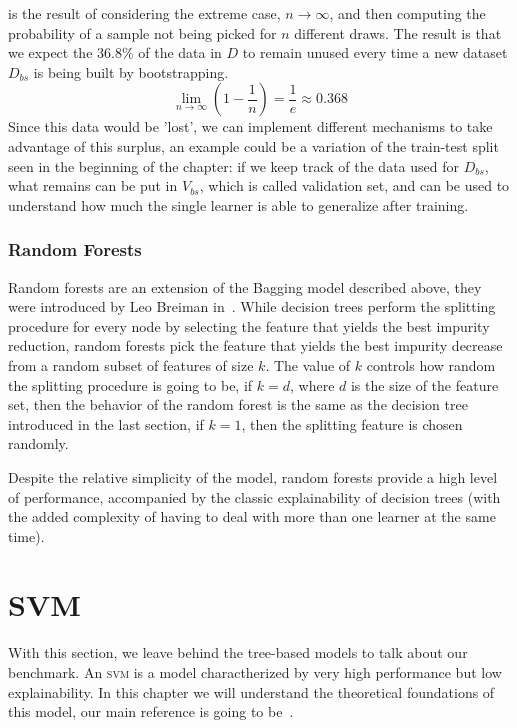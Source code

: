  is the result of considering the extreme case, $n \rightarrow \infty$, and
then computing the probability of a sample not being picked for $n$ different draws. The result is
that we expect the $36.8\%$ of the data in $D$ to remain unused every time a new dataset $D_{bs}$ is
being built by bootstrapping.
\begin{equation}
	\label{eq:bagging-limit}
	\lim_{n \rightarrow \infty} \left(1 - \frac{1}{n}\right) = \frac{1}{e} \approx 0.368
\end{equation}
Since this data would be 'lost', we can implement different mechanisms to take advantage of this
surplus, an example could be a variation of the train-test split seen in the beginning of the
chapter: if we keep track of the data used for $D_{bs}$, what remains can be put in $V_{bs}$,
which is called validation set, and can be used to understand how much the single learner is able to generalize after training.

\subsubsection{Random Forests}

Random forests are an extension of the Bagging model described above, they were introduced
by Leo Breiman in~\cite{Breiman2001}. While decision trees perform the splitting procedure for every
node by selecting the feature that yields the best impurity reduction, random forests pick the
feature that yields the best impurity decrease from a random subset of features of size $k$. The
value of $k$ controls how random the splitting procedure is going to be, if $k = d$, where $d$ is the size of the feature set, then the behavior of the random forest is the same as the decision tree introduced
in the last section, if $k = 1$, then the splitting feature is chosen randomly.

\medskip

Despite the relative simplicity of the model, random forests provide a high level of performance,
accompanied by the classic explainability of decision trees (with the added complexity of
having to deal with more than one learner at the same time).

\section{SVM}
\label{sec:svm}
With this section, we leave behind the tree-based models to talk about our benchmark. An
\textsc{svm} is a model charactherized by very high performance but low explainability. In this
chapter we will understand the theoretical foundations of this model, our main reference is going to be~\cite{ZhouZhi-Hua2021ML}.

